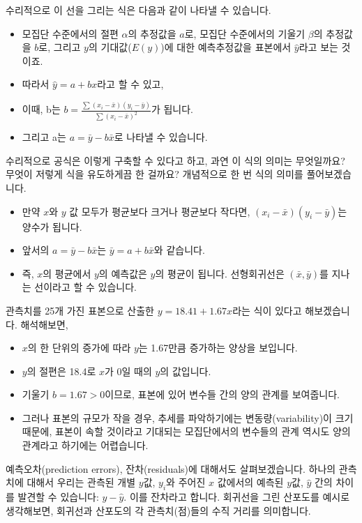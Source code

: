 \documentclass[]{book}
\providecommand{\tightlist}{%
  \setlength{\itemsep}{0pt}\setlength{\parskip}{0pt}}
\begin{document}
수리적으로 이 선을 그리는 식은 다음과 같이 나타낼 수 있습니다.

\begin{itemize}
\tightlist
\item
  모집단 수준에서의 절편 \(\alpha\)의 추정값을 \(a\)로, 모집단 수준에서의 기울기 \(\beta\)의 추정값을 \(b\)로, 그리고 \(y\)의 기대값(\(E(y)\))에 대한 예측추정값을 표본에서 \(\hat{y}\)라고 보는 것이죠.
\item
  따라서 \(\hat{y} = a + bx\)라고 할 수 있고,
\item
  이때, b는 \(b=\frac{\sum(x_i-\bar{x})(y_i-\bar{y})}{\sum(x_i-\bar{x})^2}\)가 됩니다.
\item
  그리고 a는 \(a = \bar{y}-b\bar{x}\)로 나타낼 수 있습니다.
\end{itemize}

수리적으로 공식은 이렇게 구축할 수 있다고 하고, 과연 이 식의 의미는 무엇일까요? 무엇이 저렇게 식을 유도하게끔 한 걸까요? 개념적으로 한 번 식의 의미를 풀어보겠습니다.

\begin{itemize}
\tightlist
\item
  만약 \(x\)와 \(y\) 값 모두가 평균보다 크거나 평균보다 작다면, \((x_i-\bar{x})(y_i-\bar{y})\)는 양수가 됩니다.
\item
  앞서의 \(a = \bar{y}-b\bar{x}\)는 \(\bar{y} = a + b\bar{x}\)와 같습니다.
\item
  즉, \(x\)의 평균에서 \(y\)의 예측값은 \(y\)의 평균이 됩니다. 선형회귀선은 \((\bar{x},\bar{y})\)를 지나는 선이라고 할 수 있습니다.
\end{itemize}

관측치를 25개 가진 표본으로 산출한 \(y = 18.41 + 1.67x\)라는 식이 있다고 해보겠습니다. 해석해보면,

\begin{itemize}
\tightlist
\item
  \(x\)의 한 단위의 증가에 따라 \(y\)는 1.67만큼 증가하는 양상을 보입니다.
\item
  \(y\)의 절편은 18.4로 \(x\)가 0일 때의 \(y\)의 값입니다.
\item
  기울기 \(b = 1.67 > 0\)이므로, 표본에 있어 변수들 간의 양의 관계를 보여줍니다.
\item
  그러나 표본의 규모가 작을 경우, 추세를 파악하기에는 변동량(variability)이 크기 때문에, 표본이 속할 것이라고 기대되는 모집단에서의 변수들의 관계 역시도 양의 관계라고 하기에는 어렵습니다.
\end{itemize}

예측오차(prediction errors), 잔차(residuals)에 대해서도 살펴보겠습니다. 하나의 관측치에 대해서 우리는 관측된 개별 \(y\)값, \(y_i\)와 주어진 \(x\) 값에서의 예측된 \(y\)값, \(\hat{y}\) 간의 차이를 발견할 수 있습니다: \(y - \hat{y}\). 이를 잔차라고 합니다. 회귀선을 그린 산포도를 예시로 생각해보면, 회귀선과 산포도의 각 관측치(점)들의 수직 거리를 의미합니다.
\end{document}
